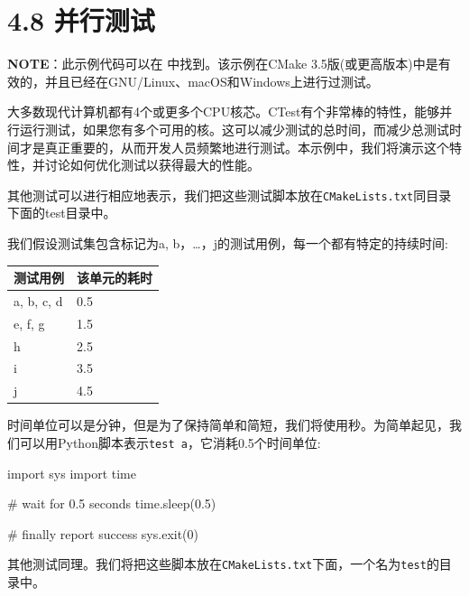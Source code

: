 \section{4.8 并行测试}

\begin{myInfoBox}
\textbf{NOTE}：此示例代码可以在  中找到。该示例在CMake 3.5版(或更高版本)中是有效的，并且已经在GNU/Linux、macOS和Windows上进行过测试。
\end{myInfoBox}

大多数现代计算机都有4个或更多个CPU核芯。CTest有个非常棒的特性，能够并行运行测试，如果您有多个可用的核。这可以减少测试的总时间，而减少总测试时间才是真正重要的，从而开发人员频繁地进行测试。本示例中，我们将演示这个特性，并讨论如何优化测试以获得最大的性能。

其他测试可以进行相应地表示，我们把这些测试脚本放在\texttt{CMakeLists.txt}同目录下面的test目录中。


我们假设测试集包含标记为a, b，…，j的测试用例，每一个都有特定的持续时间:

\begin{table}[htbp]\centering
\begin{tabularx}{\textwidth}{lX}
\toprule
测试用例 & 该单元的耗时 \\
\midrule
a, b, c, d & 0.5 \\
e, f, g & 1.5 \\
h & 2.5 \\
i & 3.5 \\
j & 4.5 \\
\bottomrule
\end{tabularx}
\end{table}

时间单位可以是分钟，但是为了保持简单和简短，我们将使用秒。为简单起见，我们可以用Python脚本表示\texttt{test a}，它消耗0.5个时间单位:

\begin{codebox}[python]
import sys
import time

# wait for 0.5 seconds
time.sleep(0.5)

# finally report success
sys.exit(0)
\end{codebox}

其他测试同理。我们将把这些脚本放在\texttt{CMakeLists.txt}下面，一个名为\texttt{test}的目录中。


